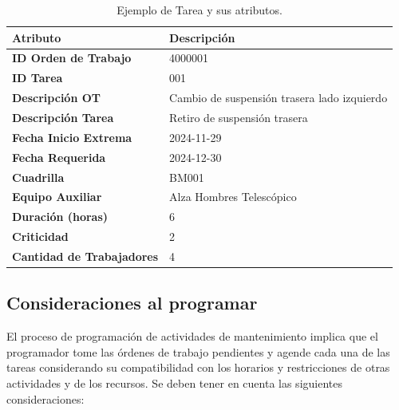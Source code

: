 \documentclass{article}
\begin{document}
\begin{table}[htbp]
    \centering
    \captionsetup{justification=centering}
    \vspace{0.5cm}
    \begin{tabular}{p{6cm} p{8cm}}
        \toprule
        \textbf{Atributo} & \textbf{Descripción} \\
        \midrule
        \textbf{ID Orden de Trabajo} & 4000001 \\
        \textbf{ID Tarea} & 001 \\
        \textbf{Descripción OT} & Cambio de suspensión trasera lado izquierdo \\
        \textbf{Descripción Tarea} & Retiro de suspensión trasera \\
        \textbf{Fecha Inicio Extrema} & 2024-11-29 \\
        \textbf{Fecha Requerida} & 2024-12-30 \\
        \textbf{Cuadrilla} & BM001 \\
        \textbf{Equipo Auxiliar} & Alza Hombres Telescópico \\
        \textbf{Duración (horas)} & 6 \\
        \textbf{Criticidad} & 2 \\
        \textbf{Cantidad de Trabajadores} & 4 \\
        \bottomrule
    \end{tabular}
    \caption{Ejemplo de Tarea y sus atributos.}
    \label{table:task}
\end{table}


\subsection{Consideraciones al programar}
El proceso de programación de actividades de mantenimiento implica que el programador tome las órdenes de trabajo pendientes y agende cada una de las tareas considerando su compatibilidad con los horarios y restricciones de otras actividades y de los recursos. Se deben tener en cuenta las siguientes consideraciones:
\end{document}
